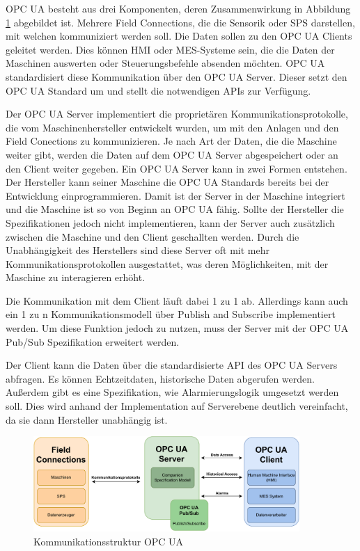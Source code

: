 \documentclass[a4paper, 12pt, oneside]{scrbook}
\begin{document}
		OPC UA besteht aus drei Komponenten, deren Zusammenwirkung in Abbildung \ref{fig:OPCUA_Structure} abgebildet ist. Mehrere Field Connections, die die Sensorik oder SPS darstellen, mit welchen kommuniziert werden soll. Die Daten sollen zu den OPC UA Clients geleitet werden. Dies können \ac{HMI} oder MES-Systeme sein, die die Daten der Maschinen auswerten oder Steuerungsbefehle absenden möchten. OPC UA standardisiert diese Kommunikation über den OPC UA Server. Dieser setzt den OPC UA Standard um und stellt die notwendigen APIs zur Verfügung. \cite{rinke_was_2022}
		
		Der OPC UA Server implementiert die proprietären Kommunikationsprotokolle, die vom Maschinenhersteller entwickelt wurden, um mit den Anlagen und den Field Conections zu kommunizieren. Je nach Art der Daten, die die Maschine weiter gibt, werden die Daten auf dem OPC UA Server abgespeichert oder an den Client weiter gegeben. Ein OPC UA Server kann in zwei Formen entstehen. Der Hersteller kann seiner Maschine die OPC UA Standards bereits bei der Entwicklung einprogrammieren. Damit ist der Server in der Maschine integriert und die Maschine ist so von Beginn an OPC UA fähig. Sollte der Hersteller die Spezifikationen jedoch nicht implementieren, kann der Server auch zusätzlich zwischen die Maschine und den Client geschallten werden. Durch die Unabhängigkeit des Herstellers sind diese Server oft mit mehr Kommunikationsprotokollen ausgestattet, was deren Möglichkeiten, mit der Maschine zu interagieren erhöht. \cite{rinke_was_2022}
		
		Die Kommunikation mit dem Client läuft dabei 1 zu 1 ab. Allerdings kann auch ein 1 zu n Kommunikationsmodell über Publish and Subscribe implementiert werden. Um diese Funktion jedoch zu nutzen, muss der Server mit der OPC UA Pub/Sub Spezifikation erweitert werden. \cite{mielebacher_verteilte_2021}
		
		Der Client kann die Daten über die standardisierte API des OPC UA Servers abfragen. Es können Echtzeitdaten, historische Daten abgerufen werden. Außerdem gibt es eine Spezifikation, wie Alarmierungslogik umgesetzt werden soll. Dies wird anhand der Implementation auf Serverebene deutlich vereinfacht, da sie dann Hersteller unabhängig ist. \cite{rinke_was_2022}
		
		\begin{figure}[H]
			\centering
			\includegraphics[width=0.9\textwidth]{res/diagramms/OPCUA.pdf}
			\caption{Kommunikationsstruktur OPC UA}
			\label{fig:OPCUA_Structure}
		\end{figure}
		
\end{document}
